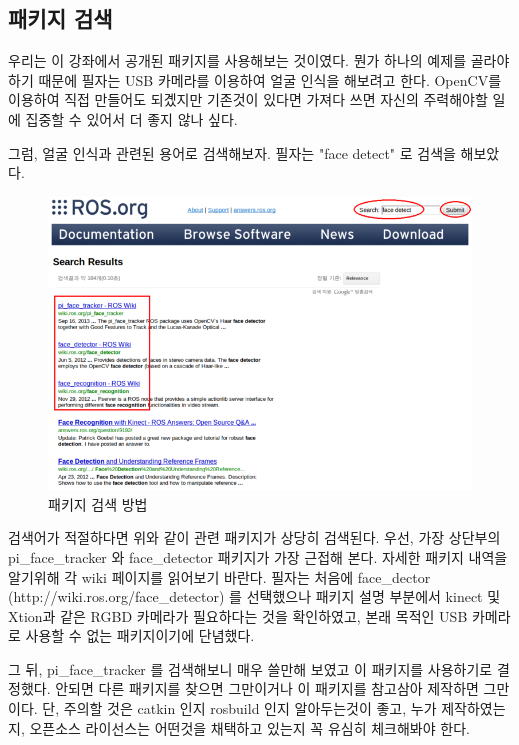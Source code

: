 \subsection{패키지 검색}

우리는 이 강좌에서 공개된 패키지를 사용해보는 것이였다. 뭔가 하나의 예제를 골라야하기 때문에 필자는 USB 카메라를 이용하여 얼굴 인식을 해보려고 한다. OpenCV를 이용하여 직접 만들어도 되곘지만 기존것이 있다면 가져다 쓰면 자신의 주력해야할 일에 집중할 수 있어서 더 좋지 않나 싶다.

그럼, 얼굴 인식과 관련된 용어로 검색해보자. 필자는 "face detect" 로 검색을 해보았다.

\begin{figure}[h]
\centering\includegraphics[width=0.9\columnwidth]{pictures/chapter8/openpkg2.png}
\caption{패키지 검색 방법}
\end{figure}

검색어가 적절하다면 위와 같이 관련 패키지가 상당히 검색된다.  우선, 가장 상단부의 pi\_face\_tracker 와 face\_detector 패키지가 가장 근접해 본다. 자세한 패키지 내역을 알기위해 각 wiki 페이지를 읽어보기 바란다. 필자는 처음에 face\_dector (http://wiki.ros.org/face\_detector) 를 선택했으나 패키지 설명 부분에서 kinect 및 Xtion과 같은 RGBD 카메라가 필요하다는 것을 확인하였고, 본래 목적인 USB 카메라로 사용할 수 없는 패키지이기에 단념했다.

그 뒤, pi\_face\_tracker 를 검색해보니 매우 쓸만해 보였고 이 패키지를 사용하기로 결정했다. 안되면 다른 패키지를 찾으면 그만이거나 이 패키지를 참고삼아 제작하면 그만이다. 단, 주의할 것은 catkin 인지 rosbuild 인지 알아두는것이 좋고, 누가 제작하였는지, 오픈소스 라이선스는 어떤것을 채택하고 있는지 꼭 유심히 체크해봐야 한다.

